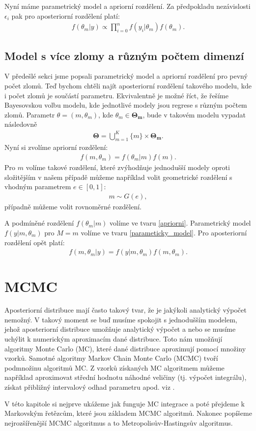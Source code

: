 \documentclass[czech,master,public,dept470,male,cpdeclaration,oneside, python]{diploma}
\begin{document}
Nyní máme parametrický model a apriorní rozdělení. Za předpokladu nezávislosti $\epsilon_i$ pak pro aposteriorní rozdělení platí:
\begin{align}\nonumber
f(\theta_m | y) \propto \prod_{i=0}^{n} f(y_i | \theta_m) f(\theta_m).
\end{align}
\subsection{Model s více zlomy a různým počtem dimenzí}
V předešlé sekci jsme popsali parametrický model a apriorní rozdělení pro pevný počet zlomů. Teď bychom chtěli najít aposteriorní rozdělení takového modelu, kde i počet zlomů je součástí parametru. Ekvivalentně je možné říct, že řešíme Bayesovskou volbu modelu, kde jednotlivé modely jsou regrese s různým počtem zlomů. Parametr $\theta = (m, \theta_m)$, kde $\theta_m \in \boldsymbol{\Theta_m}$, bude v takovém modelu vypadat následovně 
\begin{align}\nonumber
\boldsymbol{\Theta} = \bigcup_{m=1}^K\{m\} \times \boldsymbol{\Theta_m}.
\end{align}
 Nyní si zvolíme apriorní rozdělení:
\begin{align}\nonumber
f(m, \theta_m) = f(\theta_m | m)f(m).
\end{align}
Pro $m$ volíme takové rozdělení, které zvýhodňuje jednodušší modely oproti složitějším v našem případě můžeme například volit geometrické rozdělení s vhodným parametrem $e \in [0,1]$:
\begin{align}\nonumber
m \sim G(e),
\end{align}
případně můžeme volit rovnoměrné rozdělení. \par
A podmíněné rozdělení $f(\theta_m|m)$ volíme ve tvaru \eqref{apriorni}.
Parametrický model $f(y | m, \theta_m)$ pro $M=m$  volíme ve tvaru \eqref{parameticky_model}.
Pro aposteriorní rozdělení opět platí:
\begin{align}\label{supermodel}
	f(m, \theta_m | y) = f(y | m, \theta_m)f(m, \theta_m).
\end{align}
\section{MCMC}
Aposteriorní distribuce mají často takový tvar, že je jakýkoli analytický výpočet nemožný. V takový moment se buď musíme spokojit s jednodušším modelem, jehož aposteriorní distribuce umožňuje analytický výpočet a nebo se musíme uchýlit k numerickým aproximacím dané distribuce. Toto nám umožňují algoritmy Monte Carlo (MC), které dané distribuce aproximují pomocí množiny vzorků. Samotné algoritmy Markov Chain Monte Carlo (MCMC) tvoří podmnožinu algoritmů MC. Z vzorků získaných MC algoritmem můžeme například aproximovat střední hodnotu náhodné veličiny (tj. výpočet integrálu), získat přibližný intervalový odhad parametru apod. viz \cite{andrieu2003introduction}. \par
V této kapitole si nejprve ukážeme jak funguje MC integrace a poté přejdeme k Markovským řetězcům, které jsou základem MCMC algoritmů. Nakonec popíšeme nejrozšířenější MCMC algoritmus a to Metropolisův-Hastingsův algoritmus\cite{robert2004monte}.
\end{document}
